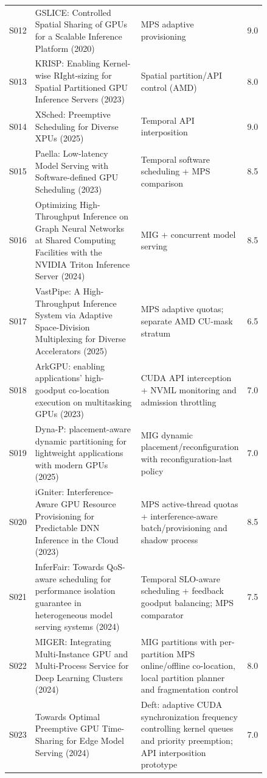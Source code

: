 \begin{longtable}{P{0.105\linewidth}P{0.52\linewidth}P{0.22\linewidth}r}
S012 & GSLICE: Controlled Spatial Sharing of GPUs for a Scalable Inference Platform (2020) \cite{gslice} & MPS adaptive provisioning & 9.0 \\
S013 & KRISP: Enabling Kernel-wise RIght-sizing for Spatial Partitioned GPU Inference Servers (2023) \cite{krisp} & Spatial partition/API control (AMD) & 8.0 \\
S014 & XSched: Preemptive Scheduling for Diverse XPUs (2025) \cite{xsched} & Temporal API interposition & 9.0 \\
S015 & Paella: Low-latency Model Serving with Software-defined GPU Scheduling (2023) \cite{paella} & Temporal software scheduling + MPS comparison & 8.5 \\
S016 & Optimizing High-Throughput Inference on Graph Neural Networks at Shared Computing Facilities with the NVIDIA Triton Inference Server (2024) \cite{gnntriton} & MIG + concurrent model serving & 8.5 \\
S017 & VastPipe: A High-Throughput Inference System via Adaptive Space-Division Multiplexing for Diverse Accelerators (2025) \cite{vastpipe} & MPS adaptive quotas; separate AMD CU-mask stratum & 6.5 \\
S018 & ArkGPU: enabling applications' high-goodput co-location execution on multitasking GPUs (2023) \cite{arkgpu} & CUDA API interception + NVML monitoring and admission throttling & 7.0 \\
S019 & Dyna-P: placement-aware dynamic partitioning for lightweight applications with modern GPUs (2025) \cite{dynap} & MIG dynamic placement/reconfiguration with reconfiguration-last policy & 7.0 \\
S020 & iGniter: Interference-Aware GPU Resource Provisioning for Predictable DNN Inference in the Cloud (2023) \cite{igniter} & MPS active-thread quotas + interference-aware batch/provisioning and shadow process & 8.5 \\
S021 & InferFair: Towards QoS-aware scheduling for performance isolation guarantee in heterogeneous model serving systems (2024) \cite{inferfair} & Temporal SLO-aware scheduling + feedback goodput balancing; MPS comparator & 7.5 \\
S022 & MIGER: Integrating Multi-Instance GPU and Multi-Process Service for Deep Learning Clusters (2024) \cite{miger} & MIG partitions with per-partition MPS online/offline co-location, local partition planner and fragmentation control & 8.0 \\
S023 & Towards Optimal Preemptive GPU Time-Sharing for Edge Model Serving (2024) \cite{deft} & Deft: adaptive CUDA synchronization frequency controlling kernel queues and priority preemption; API interposition prototype & 7.0 \\

\end{longtable}
